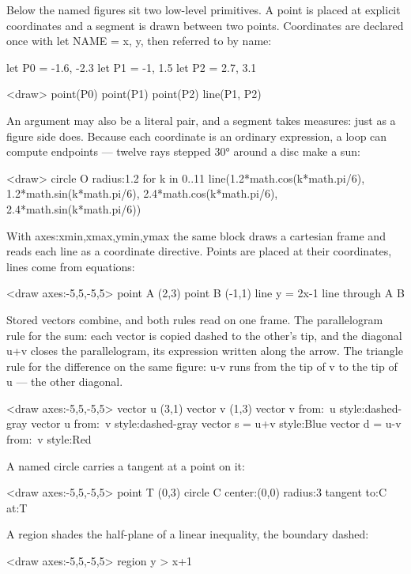 \documentclass[
  margins=8,
  font=Latin Modern Roman,
  size=12,
  linespread=1.4,
  lang=en
]{scholatex}
\begin{document}
Below the named figures sit two low-level primitives. A point is placed at
explicit coordinates and a segment is drawn between two points. Coordinates
are declared once with let NAME = {x, y}, then referred to by name:

let P0 = {-1.6, -2.3}
let P1 = {-1, 1.5}
let P2 = {2.7, 3.1}

<draw>{
	point(P0)
	point(P1)
	point(P2)
	line(P1, P2)
}

An argument may also be a literal pair, and a segment takes measures: just
as a figure side does. Because each coordinate is an ordinary expression,
a loop can compute endpoints — twelve rays stepped 30° around a disc make a
sun:

<draw>{
	circle O radius:1.2
	for k in 0..11 {
		line({1.2*math.cos(k*math.pi/6), 1.2*math.sin(k*math.pi/6)}, {2.4*math.cos(k*math.pi/6), 2.4*math.sin(k*math.pi/6)})
	}
}


With axes:{xmin,xmax,ymin,ymax} the same block draws a cartesian frame and
reads each line as a coordinate directive. Points are placed at their
coordinates, lines come from equations:

<draw axes:{-5,5,-5,5}>{
	point A (2,3)
	point B (-1,1)
	line y = 2x-1
	line through A B
}

Stored vectors combine, and both rules read on one frame. The parallelogram
rule for the sum: each vector is copied dashed to the other's tip, and the
diagonal u+v closes the parallelogram, its expression written along the
arrow. The triangle rule for the difference on the same figure: u-v runs
from the tip of v to the tip of u — the other diagonal.

<draw axes:{-5,5,-5,5}>{
	vector u (3,1)
	vector v (1,3)
	vector v from:~u style:dashed-gray
	vector u from:~v style:dashed-gray
	vector s = u+v style:Blue
	vector d = u-v from:~v style:Red
}

A named circle carries a tangent at a point on it:

<draw axes:{-5,5,-5,5}>{
	point T (0,3)
	circle C center:(0,0) radius:3
	tangent to:C at:T
}

A region shades the half-plane of a linear inequality, the boundary dashed:

<draw axes:{-5,5,-5,5}>{
	region y > x+1
}
\end{document}
